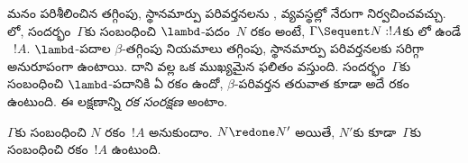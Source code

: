 \documentclass[../../../include/open-logic-section]{subfiles}
\begin{document}


మనం పరిశీలించిన తగ్గింపు, స్థానమార్పు పరివర్తనలను ,  వ్యవస్థల్లో నేరుగా నిర్వచించవచ్చు. లో, సందర్భం~$\Gamma$కు సంబంధించి $\lambd$-పదం~$N$ రకం అంటే, $\Gamma \Sequent N
: !A$కు లో  ఉండే ~$!A$. $\lambd$-పదాల $\beta$-తగ్గింపు నియమాలు  తగ్గింపు, స్థానమార్పు పరివర్తనలకు సరిగ్గా అనురూపంగా ఉంటాయి. దాని వల్ల ఒక ముఖ్యమైన ఫలితం వస్తుంది. సందర్భం~$\Gamma$కు సంబంధించి $\lambd$-పదానికి ఏ రకం ఉందో, $\beta$-పరివర్తన తరువాత కూడా అదే రకం ఉంటుంది. ఈ లక్షణాన్ని \emph{రక సంరక్షణ} అంటాం.

\begin{prop}
$\Gamma$కు సంబంధించి $N$ రకం~$!A$ అనుకుందాం. $N \redone N'$ అయితే, $N'$కు కూడా~$\Gamma$కు సంబంధించి రకం~$!A$ ఉంటుంది.
\end{prop}
\end{document}

